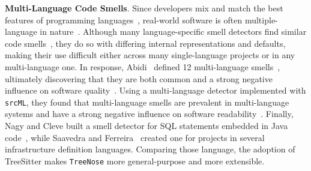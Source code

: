 
{\bf Multi-Language Code Smells}.
%
Since developers mix and match the best features of programming
languages~\cite{7476675}, real-world software is often multiple-language in
nature~\cite{723183}.
%
Although many language-specific smell detectors find similar code
smells~\cite{CheckStyle,DesigniteJava,Jscent,PMD,Pysmell}, they do so with
differing internal representations and defaults, making their use difficult
either across many single-language projects or in any multi-language one.
%
In response, Abidi~\etal{} defined 12 multi-language
smells~\cite{MultiLanguageCodeSmells}, ultimately discovering that they are
both common and a strong negative influence on software quality~\cite{Abidi2}.
%
Using a multi-language detector implemented with \texttt{srcML}, they found
that multi-language smells are prevalent in multi-language systems and have a
strong negative influence on software readability~\cite{Fault-Prone}.
%
Finally, Nagy and Cleve built a smell detector for SQL statements embedded in
Java code~\cite{SQLInJava}, while Saavedra and Ferreira~\cite{Saavedra2023}
created one for projects in several infrastructure definition languages.
%
Comparing those language, 
the adoption of TreeSitter makes \texttt{TreeNose} more general-purpose and 
more extensible.
